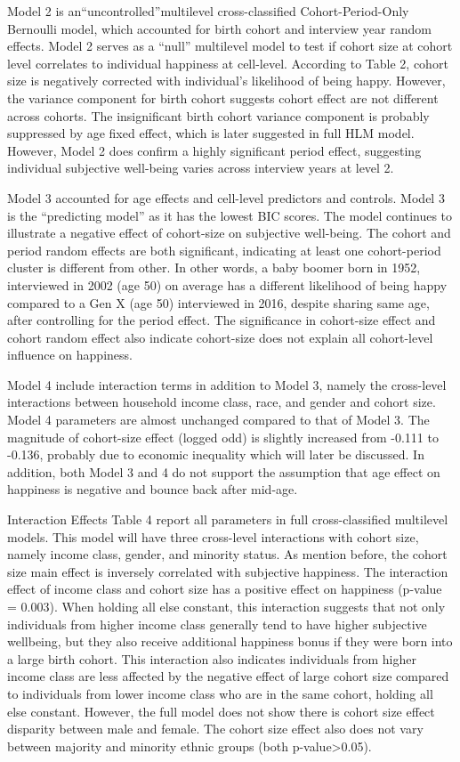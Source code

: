 Model 2 is an“uncontrolled”multilevel cross-classified Cohort-Period-Only Bernoulli model, which accounted for birth cohort and interview year random effects. Model 2 serves as a “null” multilevel model to test if cohort size at cohort level correlates to individual happiness at cell-level. According to Table 2, cohort size is negatively corrected with individual’s likelihood of being happy. However, the variance component for birth cohort suggests cohort effect are not different across cohorts. The insignificant birth cohort variance component is probably suppressed by age fixed effect, which is later suggested in full HLM model. However, Model 2 does confirm a highly significant period effect, suggesting individual subjective well-being varies across interview years at level 2.

Model 3 accounted for age effects and cell-level predictors and controls. Model 3 is the “predicting model” as it has the lowest BIC scores. The model continues to illustrate a negative effect of cohort-size on subjective well-being. The cohort and period random effects are both significant, indicating at least one cohort-period cluster is different from other. In other words, a baby boomer born in 1952, interviewed in 2002 (age 50) on average has a different likelihood of being happy compared to a Gen X (age 50) interviewed in 2016, despite sharing same age, after controlling for the period effect. The significance in cohort-size effect and cohort random effect also indicate cohort-size does not explain all cohort-level influence on happiness.

Model 4 include interaction terms in addition to Model 3, namely the cross-level interactions between household income class, race, and gender and cohort size. Model 4 parameters are almost unchanged compared to that of Model 3. The magnitude of cohort-size effect (logged odd) is slightly increased from -0.111 to -0.136, probably due to economic inequality which will later be discussed. In addition, both Model 3 and 4 do not support the assumption that age effect on happiness is negative and bounce back after mid-age. 

Interaction Effects
Table 4 report all parameters in full cross-classified multilevel models. This model will have three cross-level interactions with cohort size, namely income class, gender, and minority status. As mention before, the cohort size main effect is inversely correlated with subjective happiness. The interaction effect of income class and cohort size has a positive effect on happiness (p-value = 0.003). When holding all else constant, this interaction suggests that not only individuals from higher income class generally tend to have higher subjective wellbeing, but they also receive additional happiness bonus if they were born into a large birth cohort. This interaction also indicates individuals from higher income class are less affected by the negative effect of large cohort size compared to individuals from lower income class who are in the same cohort, holding all else constant. However, the full model does not show there is cohort size effect disparity between male and female. The cohort size effect also does not vary between majority and minority ethnic groups (both p-value>0.05).

